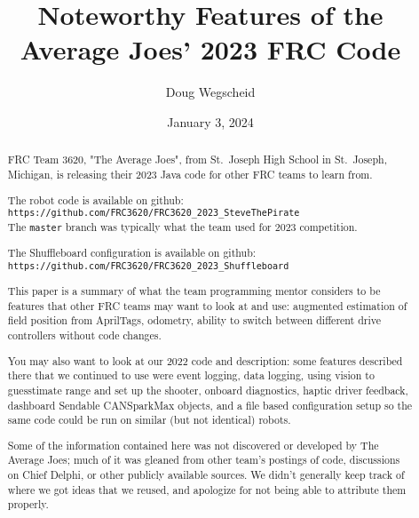 \documentclass[]{article}
\title{Noteworthy Features of the Average Joes' 2023 FRC Code}
\author{Doug Wegscheid}
\date{January 3, 2024}
\newcommand{\zztt}[1]{{\texttt{\footnotesize{#1}}}}
\begin{document}
\maketitle

\begin{abstract}

\iffalse	
\
\\
\texttt{hi()}
\\
\texttt{\small{hi()}}
\\
\texttt{\scriptsize{hi()}}
\\
\texttt{\tiny{hi()}}
\\
\zztt{hi()}
\fi

FRC Team 3620, "The Average Joes", from St.\ Joseph High School in St.\ Joseph, Michigan, is releasing their 2023 Java code for other FRC teams to learn from.

The robot code is available on github:
\\
\zztt{https://github.com/FRC3620/FRC3620\_2023\_SteveThePirate}
\\
The \zztt{master} branch was typically what the team used for 2023 competition.

The Shuffleboard configuration is available on github:
\\
\zztt{https://github.com/FRC3620/FRC3620\_2023\_Shuffleboard}

This paper is a summary of what the team programming mentor considers to be features that other FRC teams may want to look at and use: 
augmented estimation of field position from AprilTags,
odometry,
ability to switch between different drive controllers without code changes.

You may also want to look at our 2022 code and description: some features described there that we continued to use were
event logging, data logging,
using vision to guesstimate range and set up the shooter,
onboard diagnostics,
haptic driver feedback,
dashboard Sendable CANSparkMax objects,
and a file based configuration setup so the same code could be run on similar (but not identical) robots.

Some of the information contained here was not discovered or developed by The Average Joes; much of it was gleaned from other team's postings of code, discussions on Chief Delphi, or other publicly available sources.
We didn't generally keep track of where we got ideas that we reused, and apologize for not being able to attribute them properly.

\end{abstract}
\end{document}
